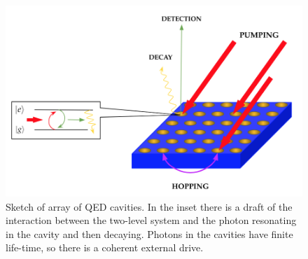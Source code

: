 \begin{figure}
    \centering
    \includegraphics[scale=0.7]{Figures/QED_cavity.png}
    \captionsetup{width=1.\linewidth}
    \caption{Sketch of array of QED cavities. In the inset there is a draft of the interaction between the two-level system and the photon resonating in the cavity and then decaying. Photons in the cavities have finite life-time, so there is a coherent external drive.}
    \label{fig:QED_cavities}
\end{figure}


